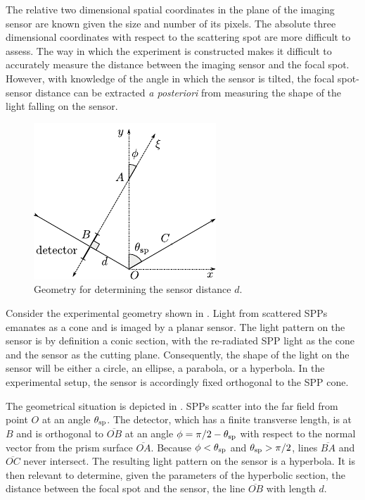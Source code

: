 The relative two dimensional spatial coordinates in the plane of the
imaging sensor are known given the size and number of its pixels.  The
absolute three dimensional coordinates with respect to the scattering spot
are more difficult to assess.  The way in which the experiment is
constructed makes it difficult to accurately measure the distance between
the imaging sensor and the focal spot.  However, with knowledge of the
angle in which the sensor is tilted, the focal spot-sensor distance can be extracted
\textit{a posteriori} from measuring the shape of the light falling on the
sensor.
\begin{figure}[ht]
\centering
\includegraphics[keepaspectratio,scale=1.25]{figures/hyperbolageoa.pdf}
\caption{Geometry for determining the sensor distance $d$.}
\label{fig:propgeo}
\end{figure}

Consider the experimental geometry shown in .
Light from scattered SPPs emanates as a cone and is imaged by a planar
sensor.  The light pattern on the sensor is by definition a conic section,
with the re-radiated SPP light as the cone and the sensor as the cutting
plane.  Consequently, the shape of the light on the sensor will be either a
circle, an ellipse, a parabola, or a hyperbola.  In the experimental setup,
the sensor is accordingly fixed orthogonal to the SPP cone.

The geometrical situation is depicted in .  SPPs
scatter into the far field from point $O$ at an angle $\theta_\mathrm{sp}$.  The
detector, which has a finite transverse length, is at $B$ and is orthogonal
to $\overline{OB}$ at an angle $\phi=\pi/2-\theta_\mathrm{sp}$ with respect to the
normal vector from the prism surface $\overline{OA}$.  Because
$\phi<\theta_\mathrm{sp}$ and $\theta_\mathrm{sp}>\pi/2$, lines $\overline{BA}$ and
$\overline{OC}$ never intersect. The resulting light pattern on the sensor is a hyperbola.  It is
then relevant to determine, given the parameters of the hyperbolic section,
the distance between the focal spot and the sensor, the line
$\overline{OB}$ with length $d$.  

